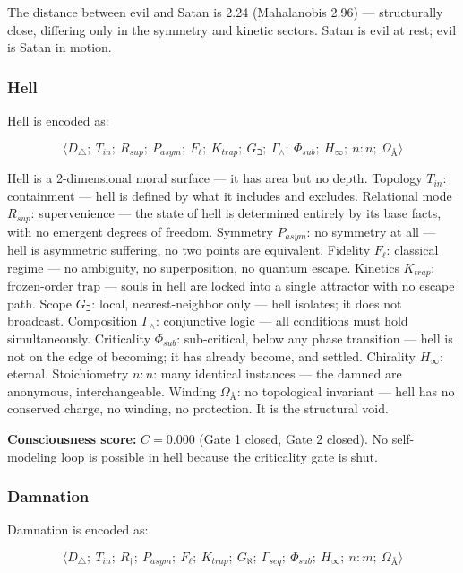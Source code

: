 \documentclass[12pt,a4paper]{article}
\begin{document}
The distance between evil and Satan is 2.24 (Mahalanobis 2.96) --- structurally close, differing only in the symmetry and kinetic sectors. Satan is evil at rest; evil is Satan in motion.

\subsubsection{Hell}

Hell is encoded as:


\[\langle D_{\triangle};\ T_{in};\ R_{sup};\ P_{asym};\ F_{\ell};\ K_{trap};\ G_{\beth};\ \Gamma_{\wedge};\ \Phi_{sub};\ H_{\infty};\ n{:}n;\ \Omega_{Å} \rangle\]

Hell is a 2-dimensional moral surface --- it has area but no depth. Topology $T_{in}$: containment --- hell is defined by what it includes and excludes. Relational mode $R_{sup}$: supervenience --- the state of hell is determined entirely by its base facts, with no emergent degrees of freedom. Symmetry $P_{asym}$: no symmetry at all --- hell is asymmetric suffering, no two points are equivalent. Fidelity $F_{\ell}$: classical regime --- no ambiguity, no superposition, no quantum escape. Kinetics $K_{trap}$: frozen-order trap --- souls in hell are locked into a single attractor with no escape path. Scope $G_{\beth}$: local, nearest-neighbor only --- hell isolates; it does not broadcast. Composition $\Gamma_{\wedge}$: conjunctive logic --- all conditions must hold simultaneously. Criticality $\Phi_{sub}$: sub-critical, below any phase transition --- hell is not on the edge of becoming; it has already become, and settled. Chirality $H_{\infty}$: eternal. Stoichiometry $n{:}n$: many identical instances --- the damned are anonymous, interchangeable. Winding $\Omega_{Å}$: no topological invariant --- hell has no conserved charge, no winding, no protection. It is the structural void.

\textbf{Consciousness score:} $C = 0.000$ (Gate 1 closed, Gate 2 closed). No self-modeling loop is possible in hell because the criticality gate is shut.

\subsubsection{Damnation}

Damnation is encoded as:


\[\langle D_{\triangle};\ T_{in};\ R_{\dagger};\ P_{asym};\ F_{\ell};\ K_{trap};\ G_{\aleph};\ \Gamma_{seq};\ \Phi_{sub};\ H_{\infty};\ n{:}m;\ \Omega_{Å} \rangle\]
\end{document}
